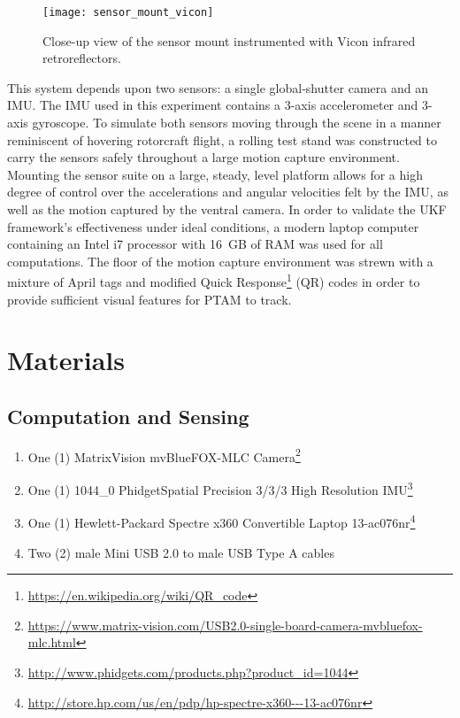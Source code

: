 \begin{figure}
  \centering
    \texttt{[image: sensor\_mount\_vicon]}
  \caption[Sensor Mount Instrumented with Vicon Retroreflectors]{Close-up view of the sensor mount instrumented with Vicon infrared retroreflectors.}
  \label{fig:sensor_mount_vicon}
\end{figure}

This system depends upon two sensors: a single global-shutter camera and an IMU. The IMU used in this experiment contains a 3-axis accelerometer and 3-axis gyroscope. To simulate both sensors moving through the scene in a manner reminiscent of hovering rotorcraft flight, a rolling test stand was constructed to carry the sensors safely throughout a large motion capture environment. Mounting the sensor suite on a large, steady, level platform allows for a high degree of control over the accelerations and angular velocities felt by the IMU, as well as the motion captured by the ventral camera. In order to validate the UKF framework's effectiveness under ideal conditions, a modern laptop computer containing an Intel i7 processor with 16~GB of RAM was used for all computations. The floor of the motion capture environment was strewn with a mixture of April tags and modified Quick Response\footnote{\url{https://en.wikipedia.org/wiki/QR_code}} (QR) codes in order to provide sufficient visual features for PTAM to track.

\section{Materials}
\subsection{Computation and Sensing}
\begin{enumerate}
\item One (1) MatrixVision mvBlueFOX-MLC Camera\footnote{\url{https://www.matrix-vision.com/USB2.0-single-board-camera-mvbluefox-mlc.html}}
\item One (1) 1044\_0 PhidgetSpatial Precision 3/3/3 High Resolution IMU\footnote{\url{http://www.phidgets.com/products.php?product_id=1044}}
\item One (1) Hewlett-Packard Spectre x360 Convertible Laptop 13-ac076nr\footnote{\url{http://store.hp.com/us/en/pdp/hp-spectre-x360---13-ac076nr}}
\item Two (2) male Mini USB 2.0 to male USB Type A cables
\end{enumerate}

